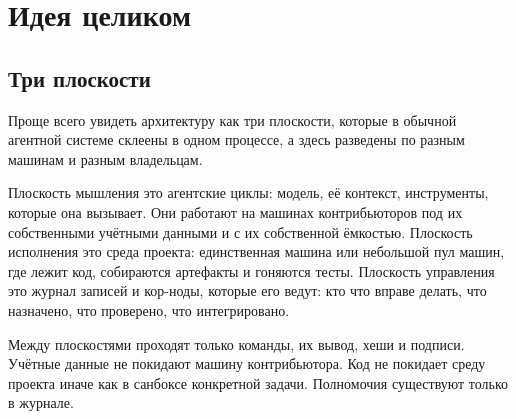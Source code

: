 \chapter{Идея целиком}

\section{Три плоскости}

Проще всего увидеть архитектуру как три плоскости, которые в обычной агентной системе склеены в одном процессе, а здесь разведены по разным машинам и разным владельцам.

\begin{center}
\end{center}

Плоскость мышления это агентские циклы: модель, её контекст, инструменты, которые она вызывает. Они работают на машинах контрибьюторов под их собственными учётными данными и с их собственной ёмкостью. Плоскость исполнения это среда проекта: единственная машина или небольшой пул машин, где лежит код, собираются артефакты и гоняются тесты. Плоскость управления это журнал записей и кор-ноды, которые его ведут: кто что вправе делать, что назначено, что проверено, что интегрировано.

Между плоскостями проходят только команды, их вывод, хеши и подписи. Учётные данные не покидают машину контрибьютора. Код не покидает среду проекта иначе как в санбоксе конкретной задачи. Полномочия существуют только в журнале.

